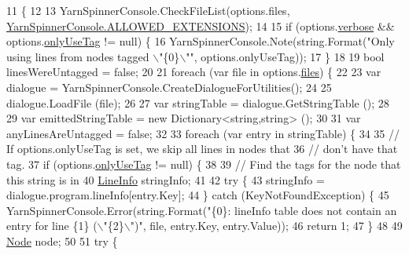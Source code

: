 \begin{DoxyCode}
11         \{
12 
13             YarnSpinnerConsole.CheckFileList(options.files, 
      \hyperlink{a00171_a0979de7ea02c8c0375b8220a12e6575e}{YarnSpinnerConsole.ALLOWED\_EXTENSIONS});
14 
15             \textcolor{keywordflow}{if} (options.\hyperlink{a00022_ada4d83d1756918f362d55f6649b82b17}{verbose} && options.\hyperlink{a00085_a8b30c1b7fb1b74eae455a568c1024b3d}{onlyUseTag} != null) \{
16                 YarnSpinnerConsole.Note(string.Format(\textcolor{stringliteral}{"Only using lines from nodes tagged \(\backslash\)"\{0\}\(\backslash\)""}, 
      options.onlyUseTag));
17             \}
18 
19             \textcolor{keywordtype}{bool} linesWereUntagged = \textcolor{keyword}{false};
20 
21             \textcolor{keywordflow}{foreach} (var file \textcolor{keywordflow}{in} options.\hyperlink{a00022_aa93cbb1bc1d5328e0a417012621e92d2}{files}) \{
22 
23                 var dialogue = YarnSpinnerConsole.CreateDialogueForUtilities();
24 
25                 dialogue.LoadFile (file);
26 
27                 var stringTable = dialogue.GetStringTable ();
28 
29                 var emittedStringTable = \textcolor{keyword}{new} Dictionary<string,string> ();
30 
31                 var anyLinesAreUntagged = \textcolor{keyword}{false};
32 
33                 \textcolor{keywordflow}{foreach} (var entry \textcolor{keywordflow}{in} stringTable) \{
34 
35                     \textcolor{comment}{// If options.onlyUseTag is set, we skip all lines in nodes that}
36                     \textcolor{comment}{// don't have that tag.}
37                     \textcolor{keywordflow}{if} (options.\hyperlink{a00085_a8b30c1b7fb1b74eae455a568c1024b3d}{onlyUseTag} != null) \{
38 
39                         \textcolor{comment}{// Find the tags for the node that this string is in}
40                         \hyperlink{a00105}{LineInfo} stringInfo;
41 
42                         \textcolor{keywordflow}{try} \{
43                             stringInfo = dialogue.program.lineInfo[entry.Key];
44                         \} \textcolor{keywordflow}{catch} (KeyNotFoundException) \{
45                             YarnSpinnerConsole.Error(string.Format(\textcolor{stringliteral}{"\{0\}: lineInfo table does not contain an
       entry for line \{1\} (\(\backslash\)"\{2\}\(\backslash\)")"}, file, entry.Key, entry.Value));
46                             \textcolor{keywordflow}{return} 1;
47                         \}
48 
49                         \hyperlink{a00031_dd/de2/a00320}{Node} node;
50 
51                         \textcolor{keywordflow}{try} \{

\end{DoxyCode}
